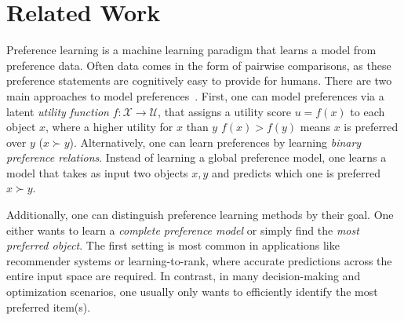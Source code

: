 \documentclass{article}
\begin{document}





\newpage
\appendix
\onecolumn


\section{Related Work} \label{appendix:related_work}

Preference learning is a machine learning paradigm that learns a model from preference data. Often data comes in the form of pairwise comparisons, as these preference statements are cognitively easy to provide for humans. There are two main approaches to model preferences~\cite{huellermeier2024preference}. First, one can model preferences via a latent \emph{utility function} $f: \mathcal{X} \rightarrow \mathcal{U}$, that assigns a utility score $u = f(x)$ to each object $x$, where a higher utility for $x$ than $y$ $f(x) > f(y)$ means $x$ is preferred over $y$ ($x \succ y$). Alternatively, one can learn preferences by learning \emph{binary preference relations}. Instead of learning a global preference model, one learns a model that takes as input two objects $x, y$ and predicts which one is preferred $x \succ y$.

Additionally, one can distinguish preference learning methods by their goal. One either wants to learn a \emph{complete preference model} or simply find the \emph{most preferred object}. The first setting is most common in applications like recommender systems or learning-to-rank, where accurate predictions across the entire input space are required. In contrast, in many decision-making and optimization scenarios, one usually only wants to efficiently identify the most preferred item(s). 
\end{document}
